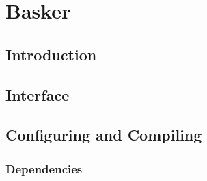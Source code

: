
\chapter{Basker}
\label{C:Basker}


\section{Introduction}\label{S:Basker:Introduction}

\section{Interface}\label{S:Basker:Interface}

\section{Configuring and Compiling}\label{S::Basker:Config}

\subsection{Dependencies}

